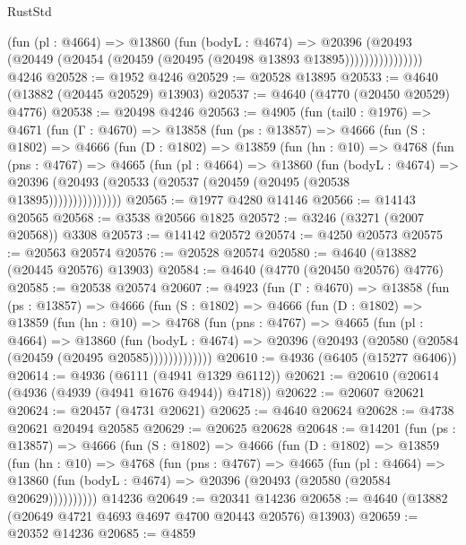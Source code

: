 \begin{lexlean}{RustStd}
\begin{coremodule}
                    (fun (pl : @4664) =>
                    @13860
                      (fun (bodyL : @4674) =>
                      @20396
                        (@20493
                          (@20449 (@20454 (@20459 (@20495 (@20498 @13893 @13895))))))))))))))))
    @4246
@20528 := @1952 @4246
@20529 := @20528 @13895
@20533 := @4640 (@13882 (@20445 @20529) @13903)
@20537 := @4640 (@4770 (@20450 @20529) @4776)
@20538 := @20498 @4246
@20563 := @4905
    (fun (tail0 : @1976) =>
    @4671
      (fun (Γ : @4670) =>
      @13858
        (fun (ps : @13857) =>
        @4666
          (fun (S : @1802) =>
          @4666
            (fun (D : @1802) =>
            @13859
              (fun (hn : @10) =>
              @4768
                (fun (pns : @4767) =>
                @4665
                  (fun (pl : @4664) =>
                  @13860
                    (fun (bodyL : @4674) =>
                    @20396 (@20493 (@20533 (@20537 (@20459 (@20495 (@20538 @13895)))))))))))))))
@20565 := @1977 @4280 @14146
@20566 := @14143 @20565
@20568 := @3538 @20566 @1825
@20572 := @3246 (@3271 (@2007 @20568)) @3308
@20573 := @14142 @20572
@20574 := @4250 @20573
@20575 := @20563 @20574
@20576 := @20528 @20574
@20580 := @4640 (@13882 (@20445 @20576) @13903)
@20584 := @4640 (@4770 (@20450 @20576) @4776)
@20585 := @20538 @20574
@20607 := @4923
    (fun (Γ : @4670) =>
    @13858
      (fun (ps : @13857) =>
      @4666
        (fun (S : @1802) =>
        @4666
          (fun (D : @1802) =>
          @13859
            (fun (hn : @10) =>
            @4768
              (fun (pns : @4767) =>
              @4665
                (fun (pl : @4664) =>
                @13860
                  (fun (bodyL : @4674) =>
                  @20396 (@20493 (@20580 (@20584 (@20459 (@20495 @20585)))))))))))))
@20610 := @4936 (@6405 (@15277 @6406))
@20614 := @4936 (@6111 (@4941 @1329 @6112))
@20621 := @20610 (@20614 (@4936 (@4939 (@4941 @1676 @4944)) @4718))
@20622 := @20607 @20621
@20624 := @20457 (@4731 @20621)
@20625 := @4640 @20624
@20628 := @4738 @20621 @20494 @20585
@20629 := @20625 @20628
@20648 := @14201
    (fun (ps : @13857) =>
    @4666
      (fun (S : @1802) =>
      @4666
        (fun (D : @1802) =>
        @13859
          (fun (hn : @10) =>
          @4768
            (fun (pns : @4767) =>
            @4665
              (fun (pl : @4664) =>
              @13860 (fun (bodyL : @4674) => @20396 (@20493 (@20580 (@20584 @20629))))))))))
    @14236
@20649 := @20341 @14236
@20658 := @4640 (@13882 (@20649 @4721 @4693 @4697 @4700 @20443 @20576) @13903)
@20659 := @20352 @14236
@20685 := @4859

\end{coremodule}
\end{lexlean}
